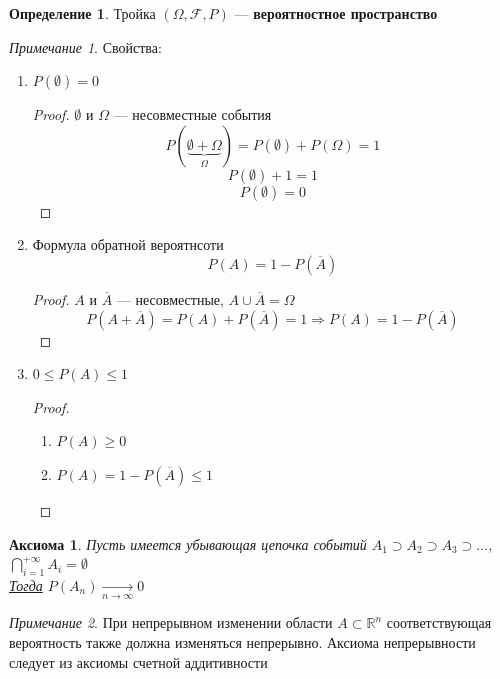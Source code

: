 \documentclass[english]{article}
\newcommand{\R}{\mathbb{R}}
\theoremstyle{plain}
\newtheorem{axiom}{Аксиома}
\theoremstyle{remark}
\newtheorem*{remark}{Примечание}
\theoremstyle{definition}
\newtheorem*{definition}{Определение}
\begin{document}
\begin{definition}
Тройка \((\Omega, \mathcal{F}, P)\) --- \textbf{вероятностное пространство}
\end{definition}
\begin{remark}
Свойства:
\begin{enumerate}
\item \(P(\emptyset) = 0\)
\begin{proof}
\(\emptyset\) и \(\Omega\) --- несовместные события
\[ P(\underbrace{\emptyset + \Omega}_\Omega) = P(\emptyset) + P(\Omega) = 1 \]
\[ P(\emptyset) + 1 = 1 \]
\[ P(\emptyset) = 0 \]
\end{proof}
\item Формула обратной вероятнсоти \[ P(A) = 1 - P(\overline{A}) \]
\begin{proof}
\(A\) и \(\overline{A}\) --- несовместные, \(A \cup \overline{A} = \Omega\)
\[ P(A + \overline{A}) = P(A) + P(\overline{A}) = 1 \Rightarrow P(A) = 1 - P(\overline{A}) \]
\end{proof}
\item \(0 \le P(A) \le 1\)
\begin{proof}
\-
\begin{enumerate}
\item \(P(A) \ge 0\)
\item \(P(A) = 1 - P(\overline{A}) \le 1\)
\end{enumerate}
\end{proof}
\end{enumerate}
\end{remark}
\begin{axiom}
Пусть имеется убывающая цепочка событий \(A_1 \supset A_2 \supset A_3 \supset \dots\), \(\bigcap_{i = 1}^{+ \infty} A_i = \emptyset\) \\
\uline{Тогда} \(P(A_n) \xrightarrow[n \to \infty]{} 0\)
\end{axiom}
\begin{remark}
При непрерывном изменении области \(A\subset \R^n\) соответствующая вероятность также должна изменяться непрерывно.
Аксиома непрерывности следует из аксиомы счетной аддитивности
\end{remark}
\end{document}
